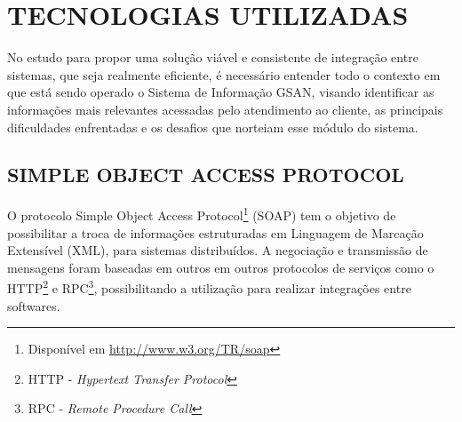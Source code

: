 



\section{TECNOLOGIAS UTILIZADAS}

No estudo para propor uma solução viável e consistente de integração entre sistemas, que seja realmente eficiente, é necessário entender todo o contexto em que está sendo operado o Sistema de Informação GSAN, visando identificar as informações mais relevantes acessadas pelo atendimento ao cliente, as principais dificuldades enfrentadas e os desafios que norteiam esse módulo do sistema. 



\subsection{\textbf{\uppercase{Simple Object Access Protocol}}}
O protocolo Simple Object Access Protocol\footnote{Disponível em  \url{http://www.w3.org/TR/soap}} (SOAP) tem o objetivo de possibilitar a troca de informações estruturadas em Linguagem de Marcação Extensível (XML), para sistemas distribuídos. A negociação e transmissão de mensagens foram baseadas em outros em outros protocolos de serviços como o HTTP\footnote{HTTP - \textit{Hypertext Transfer Protocol}}  e RPC\footnote{RPC - \textit{Remote Procedure Call}}, possibilitando a utilização para realizar integrações entre softwares.

